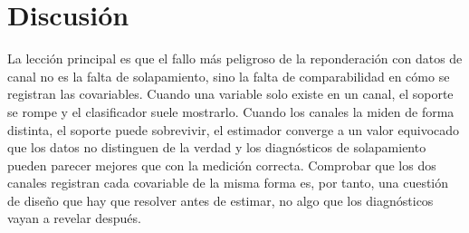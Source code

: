 \section{Discusión}\label{sec:discusion}

La lección principal es que el fallo más peligroso de la reponderación con datos de canal no es la falta de solapamiento, sino la falta de comparabilidad en cómo se registran las covariables. Cuando una variable solo existe en un canal, el soporte se rompe y el clasificador suele mostrarlo. Cuando los canales la miden de forma distinta, el soporte puede sobrevivir, el estimador converge a un valor equivocado que los datos no distinguen de la verdad y los diagnósticos de solapamiento pueden parecer mejores que con la medición correcta. Comprobar que los dos canales registran cada covariable de la misma forma es, por tanto, una cuestión de diseño que hay que resolver antes de estimar, no algo que los diagnósticos vayan a revelar después.


